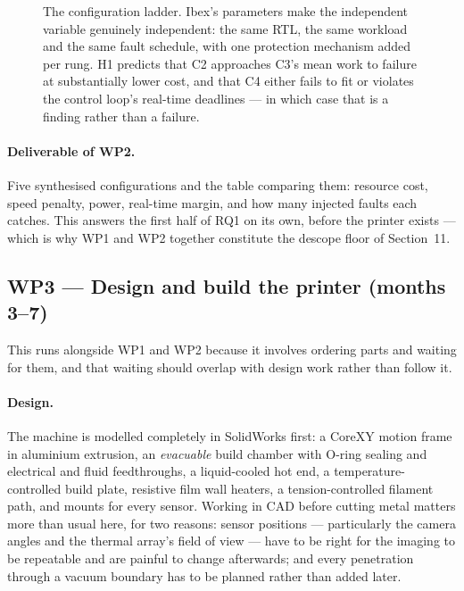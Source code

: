 \documentclass[11pt,a4paper]{article}
\begin{document}
\begin{figure}[htbp]
{}
\caption{The configuration ladder. Ibex's parameters make the independent
variable genuinely independent: the same RTL, the same workload and the same
fault schedule, with one protection mechanism added per rung. H1 predicts that
C2 approaches C3's mean work to failure at substantially lower cost, and that C4
either fails to fit or violates the control loop's real-time deadlines --- in
which case that is a finding rather than a failure.}
\label{fig:ladder}
\end{figure}

\paragraph{Deliverable of WP2.}
Five synthesised configurations and the table comparing them: resource cost,
speed penalty, power, real-time margin, and how many injected faults each
catches. This answers the first half of RQ1 on its own, before the printer
exists --- which is why WP1 and WP2 together constitute the descope floor of
Section~11.

\subsection{WP3 --- Design and build the printer (months 3--7)}

This runs alongside WP1 and WP2 because it involves ordering parts and waiting
for them, and that waiting should overlap with design work rather than follow it.

\paragraph{Design.} The machine is modelled completely in SolidWorks first: a
CoreXY motion frame in aluminium extrusion, an \emph{evacuable} build chamber
with O-ring sealing and electrical and fluid feedthroughs, a liquid-cooled hot
end, a temperature-controlled build plate, resistive film wall heaters, a
tension-controlled filament path, and mounts for every sensor. Working in CAD
before cutting metal matters more than usual here, for two reasons: sensor
positions --- particularly the camera angles and the thermal array's field of
view --- have to be right for the imaging to be repeatable and are painful to
change afterwards; and every penetration through a vacuum boundary has to be
planned rather than added later.
\end{document}
